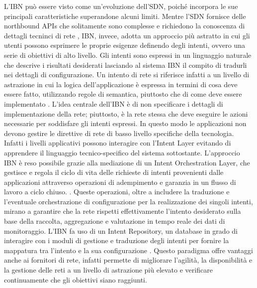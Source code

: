 \newline L'IBN può essere visto come un'evoluzione dell'SDN, poiché incorpora le sue principali caratteristiche superandone alcuni limiti.
\newline Mentre l'SDN fornisce delle northbound APIs che solitamente sono complesse e richiedono la conoscenza di dettagli tecninci di rete \cite{motivibn},
IBN, invece, adotta un approccio più astratto in cui gli utenti possono esprimere le proprie esigenze definendo degli intenti, ovvero una serie di obiettivi di alto livello.
\newline Gli intenti sono espressi in un linguaggio naturale che descrive i risultati desiderati lasciando al sistema IBN il compito di tradurli nei dettagli di configurazione.
Un intento di rete si riferisce infatti a un livello di astrazione in cui la logica dell'applicazione è espressa in termini di cosa deve essere fatto, utilizzando regole di semantica, piuttosto che di come deve essere implementato \cite{ibn2}.
L'idea centrale dell'IBN è di non specificare i dettagli di implementazione della rete; piuttosto, è la rete stessa che deve eseguire le azioni necessarie per soddisfare gli intenti espressi.
In questo modo le applicazioni non devono gestire le direttive di rete di basso livello specifiche della tecnologia. Infatti i livelli applicativi possono interagire con l'Intent Layer evitando di apprendere il linguaggio tecnico-specifico del sistema sottostante.
\newline L'approccio IBN è reso possibile grazie alla mediazione di un Intent Orchestration Layer, che gestisce e regola il ciclo di vita delle richieste di intenti provenienti dalle applicazioni attraverso operazioni 
di adempimento e garanzia in un flusso di lavoro a ciclo chiuso. \cite{ibn}.
Queste operazioni, oltre a includere la traduzione e l'eventuale orchestrazione di configurazione per la realizzazione dei singoli intenti, mirano a garantire che la rete rispetti effettivamente l'intento desiderato 
sulla base della raccolta, aggregazione e valutazione in tempo reale dei dati di monitoraggio.
\newline L'IBN fa uso di un Intent Repository, un database in grado di interagire con i moduli di gestione e traduzione 
degli intenti per fornire la mappatura tra l'intento e la sua configurazione \cite{ibnrepo}.
Questo paradigma offre vantaggi anche ai fornitori di rete, infatti permette di migliorare l'agilità, la disponibilità
e la gestione delle reti a un livello di astrazione più elevato e verificare continuamente che gli obiettivi siano raggiunti. 

